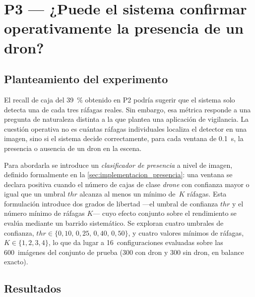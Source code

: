 \section{P3 --- ¿Puede el sistema confirmar operativamente la presencia de un dron?}
\label{sec:bloque_presencia}

\subsection{Planteamiento del experimento}
\label{sec:p3_planteamiento}

El recall de caja del \SI{39}{\percent} obtenido en P2 podría sugerir que el sistema solo detecta una de cada tres ráfagas reales. Sin embargo, esa métrica responde a una pregunta de naturaleza distinta a la que plantea una aplicación de vigilancia. La cuestión operativa no es cuántas ráfagas individuales localiza el detector en una imagen, sino si el sistema decide correctamente, para cada ventana de \SI{0.1}{\second}, la presencia o ausencia de un dron en la escena.

Para abordarla se introduce un \emph{clasificador de presencia} a nivel de imagen, definido formalmente en la \cref{sec:implementacion_presencia}: una ventana se declara positiva cuando el número de cajas de clase \emph{drone} con confianza mayor o igual que un umbral $\mathit{thr}$ alcanza al menos un mínimo de~$K$ ráfagas. Esta formulación introduce dos grados de libertad ---el umbral de confianza $\mathit{thr}$ y el número mínimo de ráfagas $K$--- cuyo efecto conjunto sobre el rendimiento se evalúa mediante un barrido sistemático. Se exploran cuatro umbrales de confianza, $\mathit{thr} \in \{0{,}10,\, 0{,}25,\, 0{,}40,\, 0{,}50\}$, y cuatro valores mínimos de ráfagas, $K \in \{1, 2, 3, 4\}$, lo que da lugar a \num{16}~configuraciones evaluadas sobre las \num{600}~imágenes del conjunto de prueba (\num{300} con dron y \num{300} sin dron, en balance exacto).

\subsection{Resultados}
\label{sec:p3_resultados}

